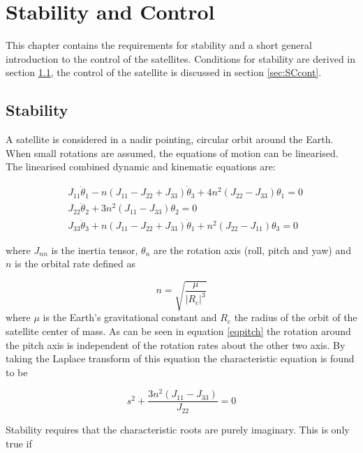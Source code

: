\chapter{Stability and Control}
\label{stabCont}
This chapter contains the requirements for stability and a short general introduction to the control of the satellites. Conditions for stability are derived in section \ref{sec:SCstab}, the control of the satellite is discussed in section \ref{sec:SCcont}.

\section{Stability}
\label{sec:SCstab}
A satellite is considered in a nadir pointing, circular orbit around the Earth. When small rotations are assumed, the equations of motion can be linearised. The linearised combined dynamic and kinematic equations are:

\begin{eqnarray}
&J_{11} \ddot{\theta}_1 - n\left(J_{11}-J_{22}+J_{33}\right) \dot{\theta}_3+ 4n^2\left(J_{22}-J_{33}\right)\theta _1= 0 \label{eqroll} \\
&J_{22} \ddot{\theta}_2 + 3n^2\left(J_{11}-J_{33}\right)\theta_2= 0 \label{eqpitch} \\
&J_{33} \ddot{\theta}_3 + n\left(J_{11}-J_{22}+J_{33}\right) \dot{\theta}_1 + n^2\left(J_{22}-J_{11}\right)\theta _3= 0 \label{eqyaw}
\end{eqnarray}

where $J_{nn}$ is the inertia tensor, $\theta_n$ are the rotation axis (roll, pitch and yaw) and $n$ is the orbital rate defined as 

\begin{equation}
n=\sqrt{\frac{\mu}{|R_c|^3}}
\label{orbrate}
\end{equation}
where $\mu$ is the Earth's gravitational constant and $R_c$ the radius of the orbit of the satellite center of mass. As can be seen in equation \ref{eqpitch} the rotation around the pitch axis is independent of the rotation rates about the other two axis. By taking the Laplace transform of this equation the characteristic equation is found to be

\begin{equation}
s^2+\frac{3n^2\left(J_{11}-J_{33}\right)}{J_{22}} = 0 
\label{lappitch}
\end{equation}

Stability requires that the characteristic roots are purely imaginary. This is only true if 

